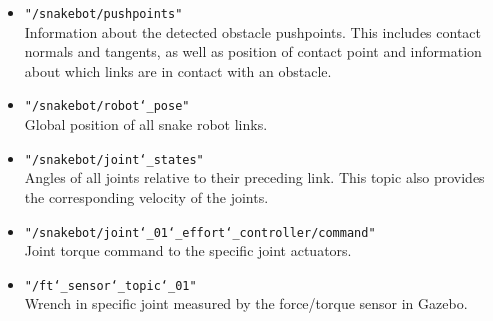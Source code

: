 \begin{itemize}
    \item \texttt{"/snakebot/pushpoints"}\\
    Information about the detected obstacle pushpoints. This includes contact normals and tangents, as well as position of contact point and information about which links are in contact with an obstacle.
    
    \item \texttt{"/snakebot/robot\char`_pose"}\\
    Global position of all snake robot links.
    
    \item \texttt{"/snakebot/joint\char`_states"}\\
    Angles of all joints relative to their preceding link. This topic also provides the corresponding velocity of the joints.
    
    \item \texttt{"/snakebot/joint\char`_01\char`_effort\char`_controller/command"}\\
    Joint torque command to the specific joint actuators.
    
    \item \texttt{"/ft\char`_sensor\char`_topic\char`_01"}\\
    Wrench in specific joint measured by the force/torque sensor in Gazebo.
\end{itemize}